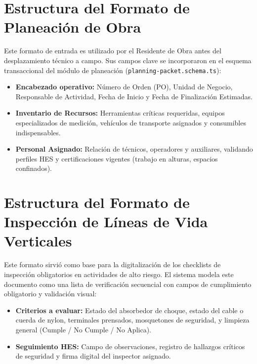 \section{Estructura del Formato de Planeación de Obra}
Este formato de entrada es utilizado por el Residente de Obra antes del desplazamiento técnico a campo. Sus campos clave se incorporaron en el esquema transaccional del módulo de planeación (\texttt{planning-packet.schema.ts}):
\begin{itemize}
    \item \textbf{Encabezado operativo:} Número de Orden (PO), Unidad de Negocio, Responsable de Actividad, Fecha de Inicio y Fecha de Finalización Estimadas.
    \item \textbf{Inventario de Recursos:} Herramientas críticas requeridas, equipos especializados de medición, vehículos de transporte asignados y consumibles indispensables.
    \item \textbf{Personal Asignado:} Relación de técnicos, operadores y auxiliares, validando perfiles HES y certificaciones vigentes (trabajo en alturas, espacios confinados).
\end{itemize}

\section{Estructura del Formato de Inspección de Líneas de Vida Verticales}
Este formato sirvió como base para la digitalización de los checklists de inspección obligatorios en actividades de alto riesgo. El sistema modela este documento como una lista de verificación secuencial con campos de cumplimiento obligatorio y validación visual:
\begin{itemize}
    \item \textbf{Criterios a evaluar:} Estado del absorbedor de choque, estado del cable o cuerda de nylon, terminales prensados, mosquetones de seguridad, y limpieza general (Cumple / No Cumple / No Aplica).
    \item \textbf{Seguimiento HES:} Campo de observaciones, registro de hallazgos críticos de seguridad y firma digital del inspector asignado.
\end{itemize}

